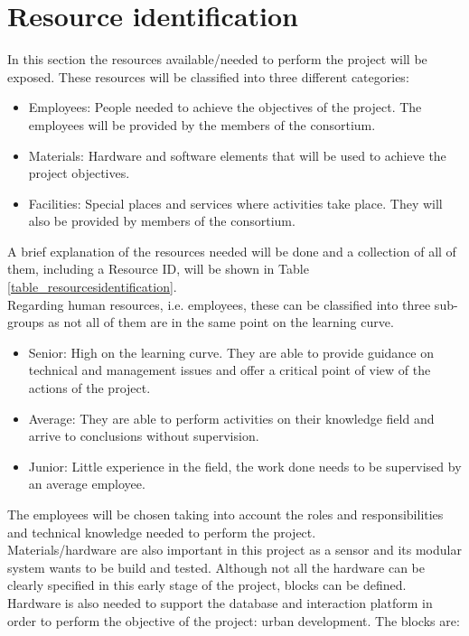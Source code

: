 \section{Resource identification}
\label{sec4.1}

In this section the resources available/needed to perform the project will be exposed. These resources will be classified into three different categories: 
\begin{itemize}
\item Employees: People needed to achieve the objectives of the project. The employees will be provided by the members of the consortium. 
\item Materials: Hardware and software elements that will be used to achieve the project objectives.
\item Facilities: Special places and services where activities take place. They will also be provided by members of the consortium.
\end{itemize}
A brief explanation of the resources needed will be done and a collection of all of them, including a Resource ID, will be shown in Table \ref{table_resourcesidentification}.\\
Regarding human resources, i.e. employees, these can be classified into three sub-groups as not all of them are in the same point on the learning curve.
\begin{itemize}
\item Senior: High on the learning curve. They are able to provide guidance on technical and management issues and offer a critical point of view of the actions of the project.
\item Average: They are able to perform activities on their knowledge field and arrive to conclusions without supervision.
\item Junior: Little experience in the field, the work done needs to be supervised by an average employee.
\end{itemize}
The employees will be chosen taking into account the roles and responsibilities and technical knowledge needed to perform the project.\\
Materials/hardware are also important in this project as a sensor and its modular system wants to be build and tested. Although not all the hardware can be clearly specified in this early stage of the project, blocks can be defined. Hardware is also needed to support the database and interaction platform in order to perform the objective of the project: urban development. The blocks are: 
